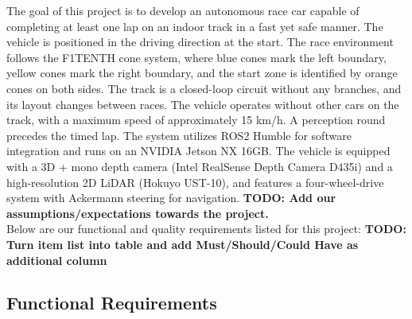The goal of this project is to develop an autonomous race car capable of completing at least one lap on an indoor track in a fast yet safe manner.
The vehicle is positioned in the driving direction at the start. The race environment follows the F1TENTH cone system, where blue cones mark the left boundary, yellow cones mark the right boundary, and the start zone is identified by orange cones on both sides.
The track is a closed-loop circuit without any branches, and its layout changes between races. The vehicle operates without other cars on the track, with a maximum speed of approximately 15 km/h. 
A perception round precedes the timed lap. The system utilizes ROS2 Humble for software integration and runs on an NVIDIA Jetson NX 16GB. The vehicle is equipped with a 3D + mono depth camera (Intel RealSense Depth Camera D435i) and a high-resolution 2D LiDAR (Hokuyo UST-10), and features a four-wheel-drive system with Ackermann steering for navigation. \textbf{TODO: Add our assumptions/expectations towards the project.}\\
\newline
Below are our functional and quality requirements listed for this project:
\textbf{TODO: Turn item list into table and add Must/Should/Could Have as additional column}
\subsection{Functional Requirements}


